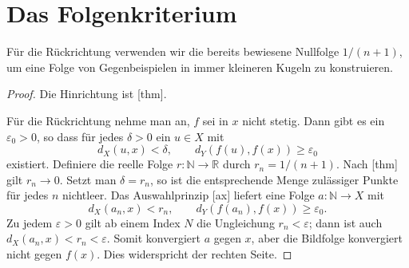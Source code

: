 \documentclass[main.tex]{subfiles}
\begin{document}
\section{Das Folgenkriterium}

Für die Rückrichtung verwenden wir die bereits bewiesene Nullfolge
\(1/(n+1)\), um eine Folge von Gegenbeispielen in immer kleineren Kugeln zu
konstruieren.

\begin{proof}
Die Hinrichtung ist
[thm].

Für die Rückrichtung nehme man an, \(f\) sei in \(x\) nicht stetig. Dann
gibt es ein \(\varepsilon_0>0\), so dass für jedes \(\delta>0\) ein
\(u\in X\) mit
\[
 d_X(u,x)<\delta,
 \qquad
 d_Y(f(u),f(x))\geq\varepsilon_0
\]
existiert. Definiere die reelle Folge \(r\colon\mathbb N\to\mathbb R\) durch
\(r_n=1/(n+1)\). Nach
[thm] gilt
\(r_n\to0\). Setzt man \(\delta=r_n\), so ist die entsprechende Menge
zulässiger Punkte für jedes \(n\) nichtleer. Das Auswahlprinzip
[ax] liefert eine Folge \(a\colon\mathbb N\to X\)
mit
\[
 d_X(a_n,x)<r_n,
 \qquad
 d_Y(f(a_n),f(x))\geq\varepsilon_0.
\]
Zu jedem \(\varepsilon>0\) gilt ab einem Index \(N\) die Ungleichung
\(r_n<\varepsilon\); dann ist auch
\(d_X(a_n,x)<r_n<\varepsilon\). Somit konvergiert \(a\) gegen \(x\), aber die
Bildfolge konvergiert nicht gegen \(f(x)\). Dies widerspricht der rechten
Seite.
\end{proof}
\end{document}

